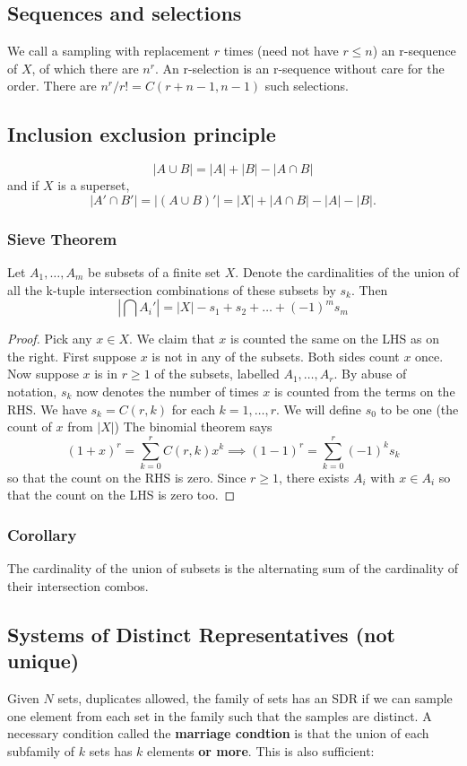 \documentclass{article}
\begin{document}
\subsection{Sequences and selections}
We call a sampling with replacement $r$ times (need not have $r \leq n$) an r-sequence of $X$, of which there are $n^r$. An r-selection is an r-sequence without care for the order.
There are $n^r \slash r! = C(r+n-1,n-1)$ such selections.
\subsection{Inclusion exclusion principle}
$$
|A \cup B| = |A| + |B| - |A \cap B|
$$
and if $X$ is a superset,
$$
|A' \cap B'| = |(A \cup B)'| = |X| + |A \cap B| - |A| - |B|.
$$
\subsubsection{Sieve Theorem}
Let $A_1,\hdots,A_m$ be subsets of a finite set $X$.
Denote the cardinalities of the union of all the k-tuple intersection combinations of these subsets by
$s_k$.
Then $$
|\bigcap A_i'| = |X|-s_1+s_2+\hdots+(-1)^ms_m
$$
\begin{proof}
Pick any $x \in X$. We claim that $x$ is counted the same on the LHS as on the right.
First suppose $x$ is not in any of the subsets. Both sides count $x$ once. Now suppose
$x$ is in $r \geq 1$ of the subsets, labelled $A_1,\hdots,A_r$.
By abuse of notation, $s_k$ now denotes the number of times $x$ is counted from the terms on the RHS.
We have $s_k = C(r,k)$ for each $k=1,\hdots, r$. We will define $s_0$ to be one (the count of $x$ from $|X|$)
The binomial theorem says $$
(1+x)^r = \sum_{k=0}^r C(r,k)x^k \implies (1-1)^r = \sum_{k=0}^r (-1)^k s_k
$$
so that the count on the RHS is zero. Since $r \geq 1$, there exists $A_i$ with $x \in A_i$ so that the count on the LHS is zero too.
\end{proof}
\subsubsection{Corollary}
The cardinality of the union of subsets is the alternating sum of the cardinality of their intersection combos.
\subsection{Systems of Distinct Representatives (not unique)}
Given $N$ sets, duplicates allowed, the family of sets has an SDR if we can sample one element from each set in the family such that
the samples are distinct. A necessary condition called the
\textbf{marriage condtion} is that the union of each subfamily of $k$
sets has $k$ elements \textbf{or more}. This is also sufficient:
\end{document}

